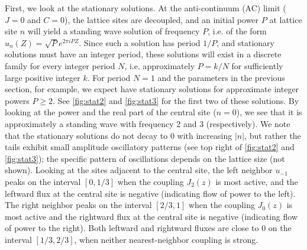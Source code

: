 \documentclass[reprint, amsmath,amssymb,aps,pre]{revtex4-2}
\begin{document}
First, we look at the stationary solutions. At the anti-continuum (AC) limit ($J=0$ and $C=0$), the lattice sites are decoupled, and an initial power $P$ at lattice site $n$ will yield a standing wave solution of frequency $P$, i.e. of the form $u_n(Z) = \sqrt{P} e^{ 2 \pi i P Z}$. Since such a solution has period $1/P$, and stationary solutions must have an integer period, these solutions will exist in a discrete family for every integer period $N$, i.e. approximately $P = k/N$ for sufficiently large positive integer $k$. For period $N=1$ and the parameters in the previous section, for example, we expect have stationary solutions for approximate integer powers $P \geq 2$. See \cref{fig:stat2} and \cref{fig:stat3} for the first two of these solutions. By looking at the power and the real part of the central site ($n=0$), we see that it is approximately a standing wave with frequency 2 and 3 (respectively). We note that the stationary solutions do not decay to 0 with increasing $|n|$, but rather the tails exhibit small amplitude oscillatory patterns (see top right of \cref{fig:stat2} and \cref{fig:stat3}); the specific pattern of oscillations depends on the lattice size (not shown).
Looking at the sites adjacent to the central site, the left neighbor $u_{-1}$ peaks on the interval $[0,1/3]$ when the coupling $J_2(z)$ is most active, and the leftward flux at the central site is negative (indicating flow of power to the left). The right neighbor peaks on the interval $[2/3, 1]$ when the coupling $J_0(z)$ is most active and the rightward flux at the central site is negative (indicating flow of power to the right). Both leftward and rightward fluxes are close to 0 on the interval $[1/3, 2/3]$, when neither nearest-neighbor coupling is strong.
\end{document}
